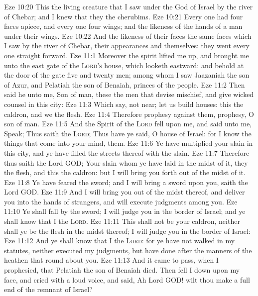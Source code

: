 \vs Eze 10:20 This  the living creature that I saw under the God of Israel by the river of Chebar; and I knew that they  the cherubims.
\vs Eze 10:21 Every one had four faces apiece, and every one four wings; and the likeness of the hands of a man  under their wings.
\vs Eze 10:22 And the likeness of their faces  the same faces which I saw by the river of Chebar, their appearances and themselves: they went every one straight forward.
\vs Eze 11:1 Moreover the spirit lifted me up, and brought me unto the east gate of the \textsc{Lord's} house, which looketh eastward: and behold at the door of the gate five and twenty men; among whom I saw Jaazaniah the son of Azur, and Pelatiah the son of Benaiah, princes of the people.
\vs Eze 11:2 Then said he unto me, Son of man, these  the men that devise mischief, and give wicked counsel in this city:
\vs Eze 11:3 Which say,  not near; let us build houses: this  the caldron, and we  the flesh.
\vs Eze 11:4 Therefore prophesy against them, prophesy, O son of man.
\vs Eze 11:5 And the Spirit of the \textsc{Lord} fell upon me, and said unto me, Speak; Thus saith the \textsc{Lord}; Thus have ye said, O house of Israel: for I know the things that come into your mind,  them.
\vs Eze 11:6 Ye have multiplied your slain in this city, and ye have filled the streets thereof with the slain.
\vs Eze 11:7 Therefore thus saith the Lord GOD; Your slain whom ye have laid in the midst of it, they  the flesh, and this  the caldron: but I will bring you forth out of the midst of it.
\vs Eze 11:8 Ye have feared the sword; and I will bring a sword upon you, saith the Lord GOD.
\vs Eze 11:9 And I will bring you out of the midst thereof, and deliver you into the hands of strangers, and will execute judgments among you.
\vs Eze 11:10 Ye shall fall by the sword; I will judge you in the border of Israel; and ye shall know that I  the \textsc{Lord}.
\vs Eze 11:11 This  shall not be your caldron, neither shall ye be the flesh in the midst thereof;  I will judge you in the border of Israel:
\vs Eze 11:12 And ye shall know that I  the \textsc{Lord}: for ye have not walked in my statutes, neither executed my judgments, but have done after the manners of the heathen that  round about you.
\vs Eze 11:13 And it came to pass, when I prophesied, that Pelatiah the son of Benaiah died. Then fell I down upon my face, and cried with a loud voice, and said, Ah Lord GOD! wilt thou make a full end of the remnant of Israel?
